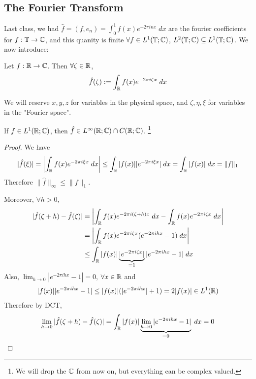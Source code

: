 \subsection{The Fourier Transform}
Last class, we had $\hat{f} = (f, e_n) = \int_0^1 f(x) e^{-2 \pi i n x} \; dx$ 
are the fourier coefficients for $f : \mathbb{T} \to \mathbb{C}$, and this quanity is finite $\forall
f \in L^1(\mathbb{T}; \mathbb{C})$, $L^2(\mathbb{T}; \mathbb{C}) \subseteq L^1(\mathbb{T}; \mathbb{C})$. We now introduce:

\begin{defn}
    Let $f : \mathbb{R} \to \mathbb{C}$. Then $\forall \zeta \in \mathbb{R}$,
    \[
        \hat{f}(\zeta) := \int_{\mathbb{R}} f(x) e^{-2 \pi i \zeta x} \; dx
    \]   
\end{defn}

\begin{rem}
    We will reserve $x, y, z$ for variables in the physical space, and $\zeta, \eta, \xi$ for
    variables in the "Fourier space".  
\end{rem}

\begin{prop}
    If $f \in L^1(\mathbb{R}; \mathbb{C})$, then $\hat{f} \in L^\infty(\mathbb{R}; \mathbb{C}) \cap C(\mathbb{R}; \mathbb{C})$. 
    \footnote{We will drop the $\mathbb{C}$ from now on, but everything can be complex valued. }
\end{prop}
\begin{proof}
    We have
    \begin{align*}
        |\hat{f}(\xi)| = \left| \int_{\mathbb{R}} f(x) e^{-2 \pi i \xi x} \; dx \right| \leq 
        \int_{\mathbb{R}} |f(x)| |e^{-2 \pi i \xi x}| \; dx = \int_{\mathbb{R}} |f(x)| \; dx = \| f \|_1
    \end{align*}
    Therefore $\| \hat{f} \|_\infty \leq \| f \|_1 $.

    Moreover, $\forall h > 0$,
    \begin{align*}
        |\hat{f}(\zeta + h) - \hat{f}(\zeta)| &= \left| \int_{\mathbb{R}} f(x) e^{-2 \pi i (\zeta + h) x} \; dx - \int_{\mathbb{R}} f(x) e^{-2 \pi i \zeta x} \; dx \right| \\
        &= \left| \int_{\mathbb{R}} f(x) e^{-2 \pi i \zeta x}(e^{-2 \pi i h x} - 1) \; dx \right| \\
        &\leq \int_{\mathbb{R}} |f(x)| \underbrace{|e^{-2 \pi i \zeta x}|}_{=1} |e^{-2 \pi i h x} - 1| \; dx
    \end{align*}
    Also, $\lim_{h \to 0} |e^{-2 \pi i h x} - 1| = 0$, $\forall x \in \mathbb{R}$ and
    \[
        |f(x)| |e^{-2 \pi i h x} - 1| \leq |f(x)|(|e^{-2 \pi i h x}| + 1) = 2 |f(x)| \in L^1(\mathbb{R})
    \]  
    Therefore by DCT,
    \[
        \lim_{h \to 0} |\hat{f}(\zeta + h) - \hat{f}(\zeta)| = \int_{\mathbb{R}} |f(x)| \underbrace{\lim_{h \to 0} |e^{-2 \pi i h x} - 1|}_{=0} \; dx = 0 \qedhere
    \] 
\end{proof}

